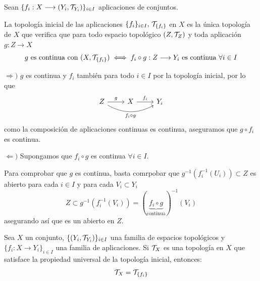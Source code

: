 \medskip

Sean $\{f_i : X\longrightarrow (Y_i, \mathcal{T}_{Y_i})\}_{i \in I}$ aplicaciones de conjuntos.
\begin{propi}
     La topolog\'ia inicial de las aplicaciones $\{f_i\}_{i \in I}, \, \mathcal{T}_{\{f_i\}}$ en $X$ es la \'unica topolog\'ia de $X$ que verifica que para todo espacio topol\'ogico $(Z, \mathcal{T}_Z)$ y toda aplicaci\'on $g: Z \longrightarrow X$
    $$g \text{ es continua con  } (X, \mathcal{T}_{\{f_i\}}) \iff f_i \circ g: Z \longrightarrow Y_i \text{ es continua } \forall i \in I$$
\end{propi}
\begin{dem}
$\Rightarrow)$ $g$ es continua y $f_i$ tambi\'en para todo $i\in I$ por la topolog\'ia inicial, por lo que  
$$\bt Z \rar{g} \arrow[bend right=10mm,swap]{rr}{f_i \circ g} & X \rar{f_i} & Y_i \et$$
como la composici\'on de aplicaciones continuas es continua, aseguramos que $g\circ f_i$ es continua.

$\Leftarrow)$ Supongamos que $f_i \circ g$ es continua $\forall i \in I$.

Para comprobar que $g$ es continua, basta comrpobar que $g^{-1}(f_i^{-1}(U_i)) \subset Z$ es abierto para cada $i \in I$ y para cada $V_i \subset Y_i$
$$Z \subset g^{-1}(f_i^{-1}(V_i)) = (\underbrace{f_i \circ g}_{\text{continua}})^{-1}(V_i) $$
asegurando as\'i que es un abierto en $Z$.
\end{dem}

\medskip

\begin{prop}
Sea $X$ un conjunto, $\{ (Y_i, \mathcal{T}_{Y_i}) \}_{i \in I}$ una familia de espacios topológicos y $\{f_i \colon X \longrightarrow Y_i\}_{i \in I}$ una familia de aplicaciones. Si $\mathcal{T}_X$ es una topología en $X$ que satisface la propiedad universal de la topología inicial, entonces:
\[
    \mathcal{T}_X = \mathcal{T}_{\{f_i\}}
\]
\end{prop}

